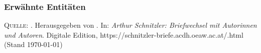 \bigskip

\normalsize

\newenvironment{esempio}[3]%
{
    \vspace{1.5ex}
    \rlap{\underline{#1}}
    \par
    \setlength{\parindent}{0cm}
    \nopagebreak
    \leftskip=#2cm
    \rightskip=#3cm
}
{
    \par
}

\bigskip

\footnotesize

\subsubsection*{Erwähnte Entitäten}

\parbox{\textwidth}{\erwaehntePersonen}

\parbox{\textwidth}{\erwaehnteWerke}

\parbox{\textwidth}{\erwaehnteOrte}

\parbox{\textwidth}{\erwaehnteEvents}

\parbox{\textwidth}{\erwaehnteInstitutionen}



\vspace{3cm}

\vfill

\footnotesize
\textsc{Quelle}: \titel. Herausgegeben von {\editorInnen}. In: \emph{Arthur Schnitzler: Briefwechsel mit Autorinnen und Autoren}.
 Digitale Edition, https://schnitzler-briefe.acdh.oeaw.ac.at/{\dateiname}.html (Stand \today)
 


